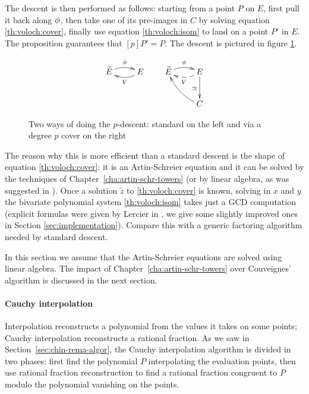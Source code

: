 The descent is then performed as follows: starting from a point $P$ on
$E$, first pull it back along $\phi$, then take one of its
pre-images in $C$ by solving equation \eqref{th:voloch:cover}, finally
use equation \eqref{th:voloch:isom} to land on a point $P'$ in $E$.
The proposition guarantees that $[p]P' = P$. The descent is pictured
in figure \ref{fig:voloch}.

\begin{figure}
  \centering
  \[
  \xymatrix{\widetilde{E}\ar@/^/[r]^{\frobisog} & E\ar@/^/[l]^{V}}
  \qquad
  \xymatrix{
    \widetilde{E}\ar@/^/[r]^{\frobisog} & E\ar@/^/@{-->}[l]^{V}\ar[d]_{\simeq}\\
    & C\ar@/^/[ul]
  }
  \]
  
  \caption{Two ways of doing the $p$-descent: standard on the left and via a degree $p$ cover on the right}
  \label{fig:voloch}
\end{figure}


The reason why this is more efficient than a standard descent is the
shape of equation \eqref{th:voloch:cover}: it is an Artin-Schreier
equation and it can be solved by the techniques of
Chapter~\ref{cha:artin-schr-towers} (or by linear algebra, as was
suggested in \cite{couveignes96}). Once a solution $\tilde{z}$ to
\eqref{th:voloch:cover} is known, solving in $x$ and $y$ the bivariate
polynomial system \eqref{th:voloch:isom} takes just a GCD computation
(explicit formulas were given by Lercier in
\cite[$\S$6.2]{lercier-algorithmique}, we give some slightly improved
ones in Section \ref{sec:implementation}). Compare this with a generic
factoring algorithm needed by standard descent.

In this section we assume that the Artin-Schreier equations are solved
using linear algebra. The impact of
Chapter~\ref{cha:artin-schr-towers} over Couveignes' algorithm is
discussed in the next section.


\paragraph{Cauchy interpolation}
Interpolation reconstructs a polynomial from the values it takes on
some points; Cauchy interpolation reconstructs a rational fraction. As
we saw in Section~\ref{sec:chin-rema-algor}, the Cauchy interpolation
algorithm is divided in two phases: first find the polynomial $P$
interpolating the evaluation points, then use rational fraction
reconstruction to find a rational fraction congruent to $P$ modulo the
polynomial vanishing on the points.

